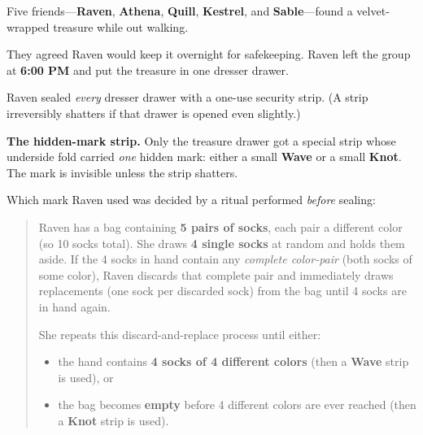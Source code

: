 
\Problem

Five friends---\textbf{Raven}, \textbf{Athena}, \textbf{Quill}, \textbf{Kestrel}, and \textbf{Sable}---found a velvet-wrapped treasure while out walking.

They agreed Raven would keep it overnight for safekeeping. Raven left the group at \textbf{6:00 PM} and put the treasure in one dresser drawer.

\medskip

\noindent Raven sealed \emph{every} dresser drawer with a one-use security strip.
(A strip irreversibly shatters if that drawer is opened even slightly.)

\medskip

\noindent\textbf{The hidden-mark strip.}
Only the treasure drawer got a special strip whose underside fold carried \emph{one} hidden mark:
either a small \textbf{Wave} or a small \textbf{Knot}. The mark is invisible unless the strip shatters.

Which mark Raven used was decided by a ritual performed \emph{before} sealing:

\begin{quote}
Raven has a bag containing \textbf{5 pairs of socks}, each pair a different color (so 10 socks total).
She draws \textbf{4 single socks} at random and holds them aside.
If the 4 socks in hand contain any \emph{complete color-pair} (both socks of some color),
Raven discards that complete pair and immediately draws replacements (one sock per discarded sock) from the bag
until 4 socks are in hand again.

She repeats this discard-and-replace process until either:
\begin{itemize}
  \item the hand contains \textbf{4 socks of 4 different colors} (then a \textbf{Wave} strip is used), or
  \item the bag becomes \textbf{empty} before 4 different colors are ever reached (then a \textbf{Knot} strip is used).
\end{itemize}
\end{quote}

